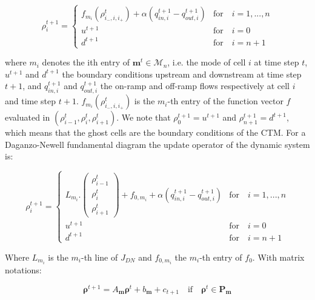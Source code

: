 \documentclass[11pt]{article}
\numberwithin{equation}{section}
\numberwithin{figure}{section}
\numberwithin{table}{section}
\begin{document}
\begin{equation}
\rho^{t+1}_{i} = \begin{cases}
f_{m_{i}}(\rho^{t}_{i_{-},i,i_{+}}) + \alpha(q^{t+1}_{in,i}-q^{t+1}_{out,i}) & \text{for}\quad i=1,...,n\\
u^{t+1} & \text{for}\quad i=0\\
d^{t+1} & \text{for}\quad i=n+1
\end{cases}
\label{eq:underlyingSystem2}
\end{equation}

\noindent where $m_{i}$ denotes the ith entry of $\boldsymbol m^{t} \in\mathcal{M}_{n}$, i.e. the mode of cell $i$ at time step $t$, $u^{t+1}$ and $d^{t+1}$ the boundary conditions upstream and downstream at time step $t+1$, and $q^{t+1}_{in,i}$ and $q^{t+1}_{out,i}$ the on-ramp and off-ramp flows respectively at cell $i$ and time step $t+1$. $f_{m_{i}}(\rho^{t}_{i_{-},i,i_{+}})$ is the $m_{i}$-th entry of the function vector $f$ evaluated in $(\rho^{t}_{i-1},\rho^{t}_{i},\rho^{t}_{i+1})$. We note that $\rho^{t+1}_{0}=u^{t+1}$ and $\rho^{t+1}_{n+1}=d^{t+1}$, which means that the ghost cells are the boundary conditions of the CTM. For a Daganzo-Newell fundamental diagram the update operator of the dynamic system is:

\begin{equation}
\rho^{t+1}_{i} = \begin{cases}
L_{m_{i}}.\left( \begin{array}{c}
\rho^{t}_{i-1}\\
\rho^{t}_{i}\\
\rho^{t}_{i+1}
\end{array} \right)
+ f_{0,m_{i}} + \alpha(q^{t+1}_{in,i}-q^{t+1}_{out,i}) & \text{for}\quad i=1,...,n\\
u^{t+1} & \text{for}\quad i=0\\
d^{t+1} & \text{for}\quad i=n+1
\end{cases}
\label{eq:underlyingSystemDN}
\end{equation}

\noindent Where $L_{m_{i}}$ is the $m_{i}$-th line of $J_{DN}$ and $f_{0,m_{i}}$ the $m_{i}$-th entry of $f_{0}$. With matrix notations:

\begin{equation}
\boldsymbol\rho^{t+1} = A_{\boldsymbol m} \boldsymbol\rho^{t} + b_{\boldsymbol m} + c_{t+1} \quad\text{if}\quad\boldsymbol\rho^{t}\in\textbf{P}_{\boldsymbol m}
\label{eq:underlyingSystemDN2}
\end{equation}
\end{document}
